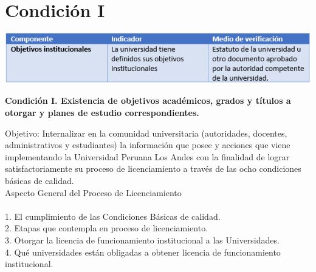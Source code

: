 \section{Condición I} 
\vspace{16mm} %
\begin{center}
\includegraphics[width=17cm]{./Imagenes/001}
\end{center}	
\vspace{12mm} %

\textbf{Condición I. Existencia de objetivos académicos, grados y títulos a otorgar y planes de estudio correspondientes.}

Objetivo:
Internalizar en la comunidad universitaria (autoridades, docentes, administrativos y estudiantes) la información que posee y acciones que viene implementando la Universidad Peruana Los Andes con la finalidad de lograr satisfactoriamente su proceso de licenciamiento a través de las ocho condiciones básicas de calidad.\\
Aspecto General del Proceso de Licenciamiento\\
\\
1.	El cumplimiento de las Condiciones Básicas de calidad.\\
2.	Etapas que contempla en proceso de licenciamiento.\\
3.	Otorgar la licencia de funcionamiento institucional a las Universidades.\\
4.	Qué universidades están obligadas a obtener licencia de funcionamiento institucional.\\


